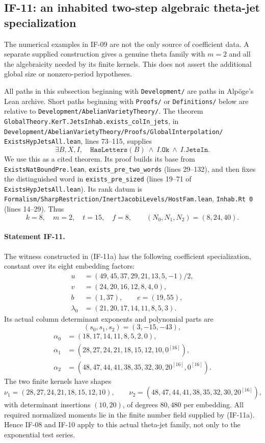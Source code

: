 \subsection{IF-11: an inhabited two-step algebraic theta-jet specialization}
The numerical examples in IF-09 are not the only source of coefficient
data. A separate supplied construction gives a genuine theta family
with $m=2$ and all the algebraicity needed by its finite kernels. This
does not assert the additional global size or nonzero-period hypotheses.

All paths in this subsection beginning with \texttt{Development/} are
paths in Alp\"oge's Lean archive. Short paths beginning with \texttt{Proofs/}
or \texttt{Definitions/} below are relative to
\texttt{Development/AbelianVarietyTheory/}. The theorem
\texttt{GlobalTheory.KerT.JetsInhab.exists\_colIn\_jets}, in
\texttt{Development/AbelianVarietyTheory/Proofs/GlobalInterpolation/}
\texttt{ExistsHypJetsAll.lean}, lines 73--115, supplies
\[
 \exists B,X,I,\quad
 \texttt{HasLetters}(B)\ \wedge\ I.\texttt{Ok}\ \wedge\ I.\texttt{JetsIn}.
                                                               \tag{IF-11a}
\]
We use this as a cited theorem. Its proof builds its base from
\texttt{ExistsNatBoundPre.lean}, \texttt{exists\_pre\_two\_words}
(lines 29--132), and then fixes the distinguished word in
\texttt{exists\_pre\_sized} (lines 19--71 of
\texttt{ExistsHypJetsAll.lean}). Its rank datum is
\texttt{Formalism/SharpRestriction/InertJacobiLevels/HostFam.lean},
\texttt{Inhab.Rt 0} (lines 14--29). Thus
\[
 k=8,\quad m=2,\quad t=15,\quad f=8,\qquad
 (N_0,N_1,N_2)=(8,24,40).
\]

\paragraph{Statement IF-11.}
The witness constructed in (IF-11a) has the following coefficient
specialization, constant over its eight embedding factors:
\[
\begin{split}
 u&=(49,45,37,29,21,13,5,-1)/2,\\
 v&=(24,20,16,12,8,4,0),\\
 b&=(1,37),\qquad e=(19,55),\\
 \lambda_0&=(21,20,17,14,11,8,5,3).
\end{split}                                                     \tag{IF-11b}
\]
Its actual column determinant exponents and polynomial parts are
\[
 (s_0,s_1,s_2)=(3,-15,-43),
\]
\[
\begin{split}
 \alpha_0&=(18,17,14,11,8,5,2,0),\\
 \alpha_1&=(28,27,24,21,18,15,12,10,0^{[16]}),\\
 \alpha_2&=(48,47,44,41,38,35,32,30,20^{[16]},0^{[16]}).
\end{split}                                                     \tag{IF-11c}
\]
The two finite kernels have shapes
\[
 \nu_1=(28,27,24,21,18,15,12,10),\qquad
 \nu_2=(48,47,44,41,38,35,32,30,20^{[16]}),          \tag{IF-11d}
\]
with determinant insertions $(10,20)$, of degrees $80,480$ per
embedding. All required normalized moments lie in the finite number
field supplied by (IF-11a). Hence IF-08 and IF-10 apply to this actual
theta-jet family, not only to the exponential test series.

